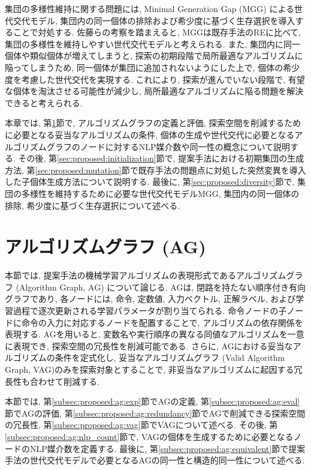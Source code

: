 \documentclass[11pt,oneside,openany,report]{jsbook}
\begin{document}
集団の多様性維持に関する問題には, Minimal Generation Gap (MGG) \cite{mgg}による世代交代モデル, 集団内の同一個体の排除および希少度に基づく生存選択を導入することで対処する. 佐藤らの考察を踏まえると, MGGは既存手法のREに比べて, 集団の多様性を維持しやすい世代交代モデルと考えられる\cite{mgg}. また, 集団内に同一個体や類似個体が増えてしまうと, 探索の初期段階で局所最適なアルゴリズムに陥ってしまうため, 同一個体が集団に追加されないようにした上で, 個体の希少度を考慮した世代交代を実現する. これにより, 探索が進んでいない段階で, 有望な個体を淘汰させる可能性が減少し, 局所最適なアルゴリズムに陥る問題を解決できると考えられる.

本章では, 第\ref{sec:proposed:ag}節で, アルゴリズムグラフの定義と評価, 探索空間を削減するために必要となる妥当なアルゴリズムの条件, 個体の生成や世代交代に必要となるアルゴリズムグラフのノードに対するNLP媒介数や同一性の概念について説明する. その後, 第\ref{sec:proposed:initialization}節で, 提案手法における初期集団の生成方法, 第\ref{sec:proposed:mutation}節で既存手法の問題点に対処した突然変異を導入した子個体生成方法について説明する. 最後に, 第\ref{sec:proposed:diversity}節で, 集団の多様性を維持するために必要な世代交代モデルMGG, 集団内の同一個体の排除, 希少度に基づく生存選択について述べる.

\section{アルゴリズムグラフ (AG)}\label{sec:proposed:ag}

本節では, 提案手法の機械学習アルゴリズムの表現形式であるアルゴリズムグラフ (Algorithm Graph, AG) について論じる. AGは, 閉路を持たない順序付き有向グラフであり, 各ノードには, 命令, 定数値, 入力ベクトル, 正解ラベル, および学習過程で逐次更新される学習パラメータが割り当てられる. 命令ノードの子ノードに命令の入力に対応するノードを配置することで, アルゴリズムの依存関係を表現する. AGを用いると, 変数名や実行順序の異なる同値なアルゴリズムを一意に表現でき, 探索空間の冗長性を削減可能である. さらに, AGにおける妥当なアルゴリズムの条件を定式化し, 妥当なアルゴリズムグラフ (Valid Algorithm Graph, VAG)のみを探索対象とすることで, 非妥当なアルゴリズムに起因する冗長性も合わせて削減する.

本節では, 第\ref{subsec:proposed:ag:exp}節でAGの定義, 第\ref{subsec:proposed:ag:eval}節でAGの評価, 第\ref{subsec:proposed:ag:redundancy}節でAGで削減できる探索空間の冗長性, 第\ref{subsec:proposed:ag:vag}節でVAGについて述べる. その後, 第\ref{subsec:proposed:ag:nlp_count}節で, VAGの個体を生成するために必要となるノードのNLP媒介数を定義する. 最後に, 第\ref{subsec:proposed:ag:equivalent}節で提案手法の世代交代モデルで必要となるAGの同一性と構造的同一性について述べる.
\end{document}
